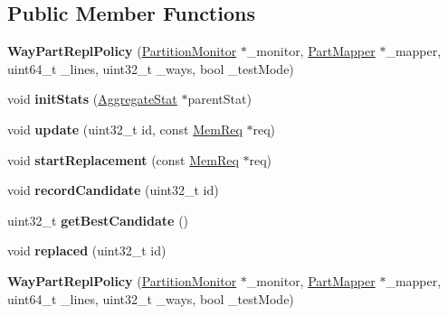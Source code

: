 \subsection*{Public Member Functions}
\begin{DoxyCompactItemize}
\item 
\hypertarget{classWayPartReplPolicy_a6f374286e7e738f7f76f47f87c171a3a}{{\bfseries Way\-Part\-Repl\-Policy} (\hyperlink{classPartitionMonitor}{Partition\-Monitor} $\ast$\-\_\-monitor, \hyperlink{classPartMapper}{Part\-Mapper} $\ast$\-\_\-mapper, uint64\-\_\-t \-\_\-lines, uint32\-\_\-t \-\_\-ways, bool \-\_\-test\-Mode)}\label{classWayPartReplPolicy_a6f374286e7e738f7f76f47f87c171a3a}

\item 
\hypertarget{classWayPartReplPolicy_a63b0823126e72f0ec951dde90c1a9977}{void {\bfseries init\-Stats} (\hyperlink{classAggregateStat}{Aggregate\-Stat} $\ast$parent\-Stat)}\label{classWayPartReplPolicy_a63b0823126e72f0ec951dde90c1a9977}

\item 
\hypertarget{classWayPartReplPolicy_a9372672c88cf0e53f9218836d760c8ff}{void {\bfseries update} (uint32\-\_\-t id, const \hyperlink{structMemReq}{Mem\-Req} $\ast$req)}\label{classWayPartReplPolicy_a9372672c88cf0e53f9218836d760c8ff}

\item 
\hypertarget{classWayPartReplPolicy_af2660add95f97c3e65e2e427c3c9c9fd}{void {\bfseries start\-Replacement} (const \hyperlink{structMemReq}{Mem\-Req} $\ast$req)}\label{classWayPartReplPolicy_af2660add95f97c3e65e2e427c3c9c9fd}

\item 
\hypertarget{classWayPartReplPolicy_a133e827b256bdd9485703968ebc6764e}{void {\bfseries record\-Candidate} (uint32\-\_\-t id)}\label{classWayPartReplPolicy_a133e827b256bdd9485703968ebc6764e}

\item 
\hypertarget{classWayPartReplPolicy_a1bc5d275de4abd8c9a91bcffefdab304}{uint32\-\_\-t {\bfseries get\-Best\-Candidate} ()}\label{classWayPartReplPolicy_a1bc5d275de4abd8c9a91bcffefdab304}

\item 
\hypertarget{classWayPartReplPolicy_ac1fd3a50f831294f63deebf5c078b98b}{void {\bfseries replaced} (uint32\-\_\-t id)}\label{classWayPartReplPolicy_ac1fd3a50f831294f63deebf5c078b98b}

\item 
\hypertarget{classWayPartReplPolicy_a6f374286e7e738f7f76f47f87c171a3a}{{\bfseries Way\-Part\-Repl\-Policy} (\hyperlink{classPartitionMonitor}{Partition\-Monitor} $\ast$\-\_\-monitor, \hyperlink{classPartMapper}{Part\-Mapper} $\ast$\-\_\-mapper, uint64\-\_\-t \-\_\-lines, uint32\-\_\-t \-\_\-ways, bool \-\_\-test\-Mode)}\label{classWayPartReplPolicy_a6f374286e7e738f7f76f47f87c171a3a}


\end{DoxyCompactItemize}
